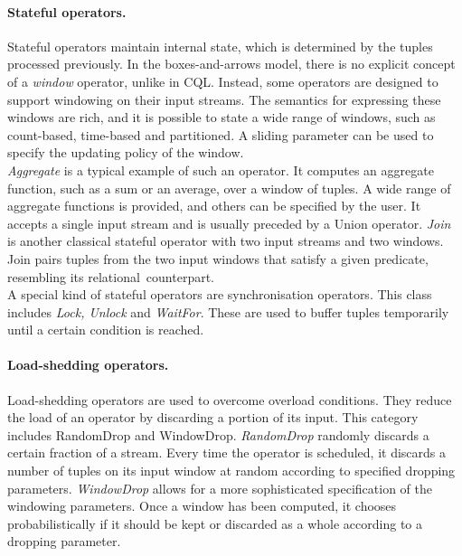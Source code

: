 \paragraph{Stateful operators.} Stateful operators maintain internal state, which is determined by the
tuples processed previously. 
In the boxes-and-arrows model, there is no explicit concept of a \emph{window} operator, unlike in CQL.
Instead, some operators are designed to support windowing on their input streams. The semantics for
expressing these windows are rich, and it is possible to state a wide range of windows, such as
count-based, time-based and partitioned. A sliding parameter can be used to specify the updating policy
of the window.\\
\emph{Aggregate} is a typical example of such an operator. It computes an aggregate function, such as a
sum or an average, over a window of tuples. A wide range of aggregate functions is provided, and others
can be specified by the user. It accepts a single input stream and is usually preceded by a Union operator. 
\emph{Join} is another classical stateful operator with two input streams and two windows. Join pairs
tuples from the two input windows that satisfy a given predicate, resembling its
relational~counterpart.\\
A special kind of stateful operators are synchronisation operators. This class includes \emph{Lock,
Unlock} and \emph{WaitFor}. These are used to buffer tuples temporarily until a certain condition is
reached.

\paragraph{\mbox{Load-shedding} operators.} Load-shedding operators are used to overcome overload
conditions. They reduce the load of an operator by discarding a portion of its input. This category includes RandomDrop and
WindowDrop. \emph{RandomDrop} randomly discards a certain fraction of a stream. Every time the operator
is scheduled, it discards a number of tuples on its input window at random according to specified
dropping parameters. \emph{WindowDrop} allows for a more sophisticated specification of the windowing
parameters. Once a window has been computed, it chooses probabilistically if it should be kept or
discarded as a whole according to a dropping parameter.\\

